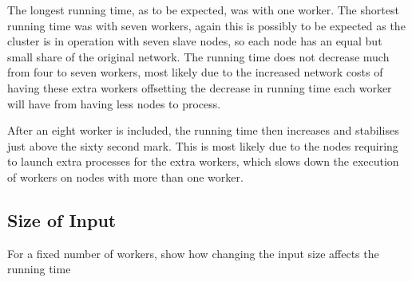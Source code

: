 The longest running time, as to be expected, was with one worker. The shortest running time was with seven workers, again this is possibly to be expected as the cluster is in operation with seven slave nodes, so each node has an equal but small share of the original network. The running time does not decrease much from four to seven workers, most likely due to the increased network costs of having these extra workers offsetting the decrease in running time each worker will have from having less nodes to process.

After an eight worker is included, the running time then increases and stabilises just above the sixty second mark. This is most likely due to the nodes requiring to launch extra processes for the extra workers, which slows down the execution of workers on nodes with more than one worker.

\subsection{Size of Input}
For a fixed number of workers, show how changing the input size affects the running time
